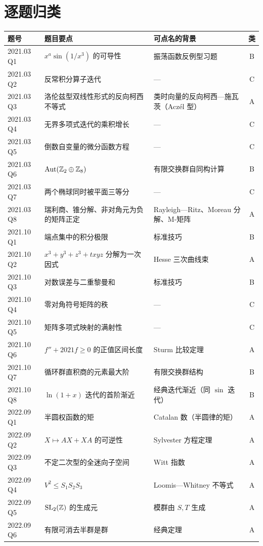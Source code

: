 \documentclass[cjk=noto, nomargin]{mojing-notes}
\begin{document}
\section{逐题归类}

{\small
\begin{longtable}{p{2.2cm}p{4.6cm}p{5.3cm}c}
\toprule
题号 & 题目要点 & 可点名的背景 & 类 \\
\midrule
\endhead
2021.03 Q1 & $x^a\sin(1/x^3)$ 的可导性 & 振荡函数反例型习题 & B \\
2021.03 Q2 & 反常积分算子迭代 & — & C \\
2021.03 Q3 & 洛伦兹型双线性形式的反向柯西不等式 & 类时向量的反向柯西—施瓦茨（Aczél 型） & A \\
2021.03 Q4 & 无界多项式迭代的乘积增长 & — & C \\
2021.03 Q5 & 倒数自变量的微分函数方程 & — & C \\
2021.03 Q6 & $\operatorname{Aut}(\mathbb{Z}_2\oplus\mathbb{Z}_8)$ & 有限交换群自同构计算 & B \\
2021.03 Q7 & 两个椭球同时被平面三等分 & — & C \\
2021.03 Q8 & 瑞利商、锥分解、非对角元为负的矩阵正定 & Rayleigh—Ritz、Moreau 分解、M-矩阵 & A \\
2021.10 Q1 & 端点集中的积分极限 & 标准技巧 & B \\
2021.10 Q2 & $x^3+y^3+z^3+txyz$ 分解为一次因式 & Hesse 三次曲线束 & A \\
2021.10 Q3 & 对数误差与二重黎曼和 & 标准技巧 & B \\
2021.10 Q4 & 零对角符号矩阵的秩 & — & C \\
2021.10 Q5 & 矩阵多项式映射的满射性 & — & C \\
2021.10 Q6 & $f''+2021f\ge0$ 的正值区间长度 & Sturm 比较定理 & A \\
2021.10 Q7 & 循环群直积商的元素最大阶 & 有限交换群结构 & B \\
2021.10 Q8 & $\ln(1+x)$ 迭代的首阶渐近 & 经典迭代渐近（同 $\sin$ 迭代） & B \\
2022.09 Q1 & 半圆权函数的矩 & Catalan 数（半圆律的矩） & A \\
2022.09 Q2 & $X\mapsto AX+XA$ 的可逆性 & Sylvester 方程定理 & A \\
2022.09 Q3 & 不定二次型的全迷向子空间 & Witt 指数 & A \\
2022.09 Q4 & $V^2\le S_1S_2S_3$ & Loomis—Whitney 不等式 & A \\
2022.09 Q5 & $\mathrm{SL}_2(\mathbb{Z})$ 的生成元 & 模群由 $S,T$ 生成 & A \\
2022.09 Q6 & 有限可消去半群是群 & 经典定理 & A \\

\end{longtable}}
\end{document}
